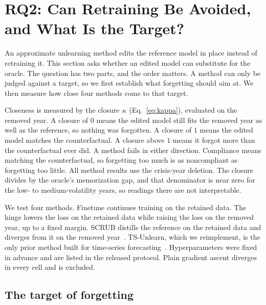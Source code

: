 \section{RQ2: Can Retraining Be Avoided, and What Is the Target?}
\label{sec:rq2}

An approximate unlearning method edits the reference model in place
instead of retraining it. This section asks whether an edited model
can substitute for the oracle. The question has two parts, and the
order matters. A method can only be judged against a target, so we
first establish what forgetting should aim at. We then measure how
close four methods come to that target.

Closeness is measured by the closure $\kappa$
(Eq.~\ref{eq:kappa}), evaluated on the removed year. A closure of
$0$ means the edited model still fits the removed year as well as
the reference, so nothing was forgotten. A closure of $1$ means the
edited model matches the counterfactual. A closure above $1$ means
it forgot more than the counterfactual ever did. A method fails in
either direction. Compliance means matching the counterfactual, so
forgetting too much is as noncompliant as forgetting too little.
All method results use the crisis-year deletion. The closure divides by the oracle's
memorization gap, and that denominator is near zero for the low- to
medium-volatility years, so readings there are not interpretable.

We test four methods. Finetune continues training on the retained
data. The hinge lowers the loss on the retained data while raising
the loss on the removed year, up to a fixed margin. SCRUB distills
the reference on the retained data and diverges from it on the
removed year~\cite{kurmanji2023scrub}. TS-Unlearn, which we
reimplement, is the only prior method built for time-series
forecasting~\cite{wang2026tsunlearn}. Hyperparameters were fixed in
advance and are listed in the released protocol. Plain gradient
ascent diverges in every cell and is excluded.

\subsection{The target of forgetting}

